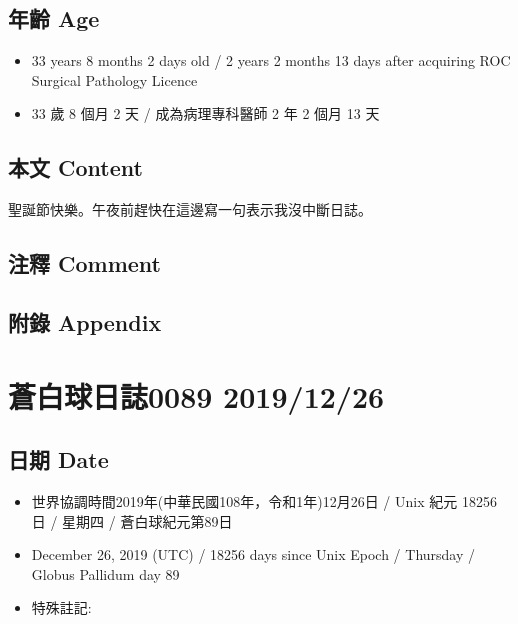 \documentclass[
]{article}
\providecommand{\tightlist}{%
  \setlength{\itemsep}{0pt}\setlength{\parskip}{0pt}}
\begin{document}
\hypertarget{ux5e74ux9f61-age-24}{%
\subsection{年齡 Age}\label{ux5e74ux9f61-age-24}}

\begin{itemize}
\tightlist
\item
  33 years 8 months 2 days old / 2 years 2 months 13 days after
  acquiring ROC Surgical Pathology Licence
\item
  33 歲 8 個月 2 天 / 成為病理專科醫師 2 年 2 個月 13 天
\end{itemize}

\hypertarget{ux672cux6587-content-24}{%
\subsection{本文 Content}\label{ux672cux6587-content-24}}

聖誕節快樂。午夜前趕快在這邊寫一句表示我沒中斷日誌。

\hypertarget{ux6ce8ux91cb-comment-23}{%
\subsection{注釋 Comment}\label{ux6ce8ux91cb-comment-23}}

\hypertarget{ux9644ux9304-appendix-24}{%
\subsection{附錄 Appendix}\label{ux9644ux9304-appendix-24}}

\hypertarget{ux84bcux767dux7403ux65e5ux8a8c0089-20191226}{%
\section{蒼白球日誌0089
2019/12/26}\label{ux84bcux767dux7403ux65e5ux8a8c0089-20191226}}

\hypertarget{ux65e5ux671f-date-25}{%
\subsection{日期 Date}\label{ux65e5ux671f-date-25}}

\begin{itemize}
\tightlist
\item
  世界協調時間2019年(中華民國108年，令和1年)12月26日 / Unix 紀元 18256
  日 / 星期四 / 蒼白球紀元第89日
\item
  December 26, 2019 (UTC) / 18256 days since Unix Epoch / Thursday /
  Globus Pallidum day 89
\item
  特殊註記:
\end{itemize}
\end{document}

